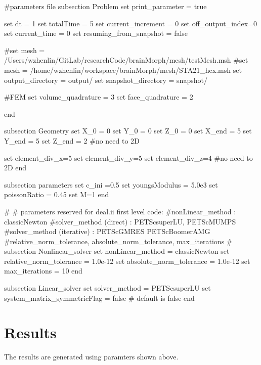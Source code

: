 \begin{DoxyCode}
\textcolor{preprocessor}{#parameters file}
\textcolor{preprocessor}{}
subsection Problem
set print\_parameter = \textcolor{keyword}{true}

set dt = 1
set totalTime = 5
set current\_increment = 0
set off\_output\_index=0
set current\_time = 0
set resuming\_from\_snapshot = \textcolor{keyword}{false}

\textcolor{preprocessor}{#set mesh = /Users/wzhenlin/GitLab/researchCode/brainMorph/mesh/testMesh.msh}
\textcolor{preprocessor}{}\textcolor{preprocessor}{#set mesh = /home/wzhenlin/workspace/brainMorph/mesh/STA21\_hex.msh}
\textcolor{preprocessor}{}set output\_directory = output/
set snapshot\_directory = snapshot/

\textcolor{preprocessor}{#FEM}
\textcolor{preprocessor}{}set volume\_quadrature = 3 
set face\_quadrature = 2 

end

subsection Geometry
set X\_0 = 0
set Y\_0 = 0
set Z\_0 = 0
set X\_end = 5 
set Y\_end = 5
set Z\_end = 2 #no need to 2D

set element\_div\_x=5
set element\_div\_y=5
set element\_div\_z=4 #no need to 2D
end

subsection parameters
set c\_ini =0.5
set youngsModulus =  5.0e3
set poissonRatio =  0.45
set M=1 
end
                        
\textcolor{preprocessor}{#}
\textcolor{preprocessor}{}\textcolor{preprocessor}{# parameters reserved for deal.ii first level code:}
\textcolor{preprocessor}{}\textcolor{preprocessor}{#nonLinear\_method : classicNewton}
\textcolor{preprocessor}{}\textcolor{preprocessor}{#solver\_method (direct) : PETScsuperLU, PETScMUMPS}
\textcolor{preprocessor}{}\textcolor{preprocessor}{#solver\_method (iterative) : PETScGMRES PETScBoomerAMG}
\textcolor{preprocessor}{}\textcolor{preprocessor}{#relative\_norm\_tolerance, absolute\_norm\_tolerance, max\_iterations}
\textcolor{preprocessor}{}\textcolor{preprocessor}{#}
\textcolor{preprocessor}{}subsection Nonlinear\_solver
        set nonLinear\_method = classicNewton
        set relative\_norm\_tolerance = 1.0e-12
        set absolute\_norm\_tolerance = 1.0e-12
        set max\_iterations = 10
end
                        
subsection Linear\_solver
        set solver\_method = PETScsuperLU
        set system\_matrix\_symmetricFlag = \textcolor{keyword}{false} # \textcolor{keywordflow}{default} is \textcolor{keyword}{false}
end
\end{DoxyCode}
 \hypertarget{growth_results}{}\section{Results}\label{growth_results}
The results are generated using paramters shown above.

  